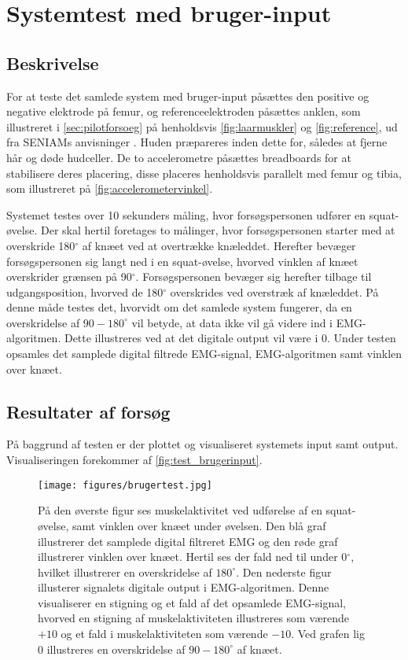 \section{Systemtest med bruger-input}

\subsection{Beskrivelse}
For at teste det samlede system med bruger-input påsættes den positive og negative elektrode på femur, og referenceelektroden påsættes anklen, som illustreret i \autoref{sec:pilotforsoeg} på henholdsvis \autoref{fig:laarmuskler} og \autoref{fig:reference}, ud fra SENIAMs anvisninger \citep{seniam2016}. Huden præpareres inden dette for, således at fjerne hår og døde hudceller. 
De to accelerometre påsættes breadboards for at stabilisere deres placering, disse placeres henholdsvis parallelt med femur og tibia, som illustreret på \autoref{fig:accelerometervinkel}.

Systemet testes over 10 sekunders måling, hvor forsøgspersonen udfører en squat-øvelse. Der skal hertil foretages to målinger, hvor forsøgspersonen starter med at overskride 180$^{\circ}$ af knæet ved at overtrække knæleddet. Herefter bevæger forsøgspersonen sig langt ned i en squat-øvelse, hvorved vinklen af knæet overskrider grænsen på 90$^{\circ}$. Forsøgspersonen bevæger sig herefter tilbage til udgangsposition, hvorved de 180$^{\circ}$ overskrides ved overstræk af knæleddet.
På denne måde testes det, hvorvidt om det samlede system fungerer, da en overskridelse af $90-180^{\circ}$ vil betyde, at data ikke vil gå videre ind i EMG-algoritmen. Dette illustreres ved at det digitale output vil være i 0. Under testen opsamles det samplede digital filtrede EMG-signal, EMG-algoritmen samt vinklen over knæet.

\subsection{Resultater af forsøg}
På baggrund af testen er der plottet og visualiseret systemets input samt output. Visualiseringen forekommer af \autoref{fig:test_brugerinput}. 
 
\begin{figure}[H]
\centering
\texttt{[image: figures/brugertest.jpg]}
\caption{På den øverste figur ses muskelaktivitet ved udførelse af en squat-øvelse, samt vinklen over knæet under øvelsen. Den blå graf illustrerer det samplede digital filtreret EMG og den røde graf illustrerer vinklen over knæet. Hertil ses der fald ned til under 0$^{\circ}$, hvilket illustrerer en overskridelse af $180^{\circ}$. Den nederste figur illusterer signalets digitale output i EMG-algoritmen. Denne visualiserer en stigning og et fald af det opsamlede EMG-signal, hvorved en stigning af muskelaktiviteten illustreres som værende $+10$ og et fald i muskelaktiviteten som værende $-10$. Ved grafen lig 0 illustreres en overskridelse af $90-180^{\circ}$ af knæet.}
\label{fig:test_brugertinput}
\end{figure}

